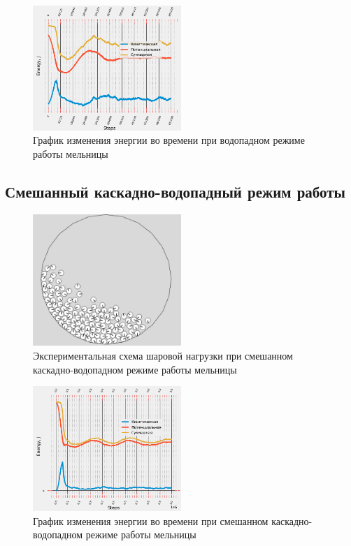 \documentclass[a4paper]{article}
\begin{document}
\begin{figure}[H]
	\centering
	\includegraphics[width=0.5\textwidth]{vodopad_energy} 
	\caption{График изменения энергии во времени при водопадном режиме работы мельницы}
	\label{pic:vodopad_energy}
\end{figure} 

\subsection{Смешанный каскадно-водопадный режим работы}

\begin{figure}[H]
	\centering
	\includegraphics[width=0.5\textwidth]{smeshan_result} 
	\caption{Экспериментальная схема шаровой нагрузки при смешанном каскадно-водопадном режиме работы мельницы}
	\label{pic:smeshan_result}
\end{figure} 

\begin{figure}[H]
	\centering
	\includegraphics[width=0.5\textwidth]{smeshan_energy} 
	\caption{График изменения энергии во времени при смешанном каскадно-водопадном режиме работы мельницы}
	\label{pic:smeshan_energy}
\end{figure} 
\end{document}
